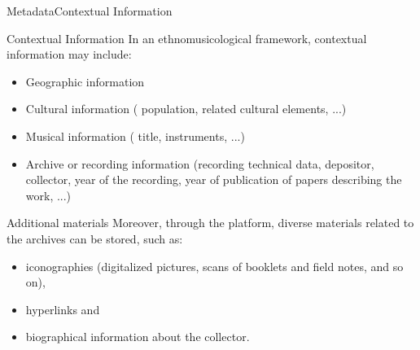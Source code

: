 \documentclass[final, hyperref, table]{beamer}
\begin{document}
\begin{frame}[label=telemeta_metadata]{Metadata}{Contextual Information}
\scriptsize
\begin{block}{Contextual Information}
  In an ethnomusicological framework, contextual information
  may include:
  \begin{itemize}
  \item Geographic information
  \item Cultural information ( population, related cultural elements, ...)
  \item Musical information ( title, instruments, ...)
  \item Archive or recording information (recording technical data, depositor, collector, year of the recording, year of publication of
    papers describing the work, ...)
  \end{itemize}
  
\end{block}

\begin{block}{Additional materials}
  Moreover, through the platform, diverse materials related to the
  archives can be stored, such as:
  \begin{itemize}
  \item iconographies (digitalized pictures, scans of booklets and
    field notes, and so on),
  \item hyperlinks and
  \item biographical information about the collector.
  \end{itemize}
\end{block}
\hyperlink{metadata_example}{}
\end{frame}


\end{document}
